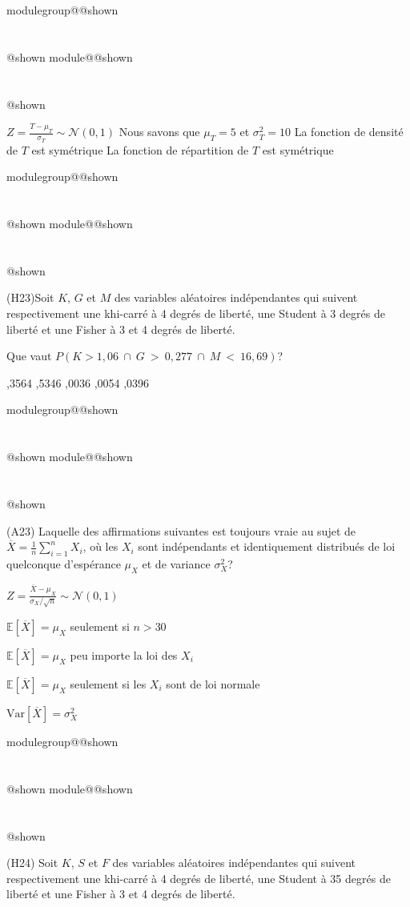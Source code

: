 \documentclass{Evaluation}
\makeatletter
\newcommand{\currentmodulekey}{}
\newcommand{\currentmoduletitle}{}
\newcommand{\currentgroupkey}{}
\newcommand{\currentgrouptitle}{}
\newcommand{\showmoduleifneeded}{%
  \ifx\currentgroupkey\empty\else
    \expandafter\ifx\csname modulegroup@\currentgroupkey @shown\endcsname\relax
      \section*{\currentgrouptitle}%
      \expandafter\gdef\csname modulegroup@\currentgroupkey @shown\endcsname{1}%
    \fi
  \fi
  \expandafter\ifx\csname module@\currentmodulekey @shown\endcsname\relax
    \section*{\currentmoduletitle}%
    \expandafter\gdef\csname module@\currentmodulekey @shown\endcsname{1}%
  \fi
}
\newenvironment{H23}{\showmoduleifneeded}{}
\newenvironment{A23}{\showmoduleifneeded}{}
\newenvironment{H24}{\showmoduleifneeded}{}
\makeatother
\begin{document}
\begin{questions}
\begin{H23}
\begin{checkboxes}
\choice $\displaystyle Z=\frac{T-\mu_T}{\sigma_T}\sim \mathcal{N}(0, 1)$
\choice Nous savons que $\mu_T=5$ et $\sigma^2_T=10$
\CorrectChoice La fonction de densité de $T$ est symétrique
\choice La fonction de répartition de $T$ est symétrique
\end{checkboxes}
\end{H23}

\begin{H23}
\question (H23)Soit $K$, $G$ et $M$ des variables aléatoires indépendantes qui suivent respectivement une khi-carré à 4 degrés de liberté, une Student à 3 degrés de liberté et une Fisher à 3 et 4 degrés de liberté. 

Que vaut $P(K>1,06~\cap~G~>~0,277~\cap~M~<~16,69)$?

\begin{oneparcheckboxes}
		,3564
		,5346
		,0036
		,0054
		,0396
\end{oneparcheckboxes}
\end{H23}

\begin{A23}
\question (A23) Laquelle des affirmations suivantes est toujours vraie au sujet de $\overline{X}=\displaystyle \frac{1}{n}\sum_{i=1}^n X_i$, où les $X_i$ sont indépendants et identiquement distribués de loi quelconque d'espérance $\mu_X$ et de variance $\sigma^2_X$? %

\begin{checkboxes}
\choice $\displaystyle Z=\frac{\overline{X}-\mu_X}{\sigma_X / \sqrt{n}}\sim \mathcal{N}(0, 1)$

\choice $\mathbb{E}\left[\overline{X}\right]=\mu_X$ seulement si $n>30$

\correctchoice $\mathbb{E}\left[\overline{X}\right]=\mu_X$ peu importe la loi des $X_i$

\choice $\displaystyle\mathbb{E}\left[\overline{X}\right]=\mu_X$  seulement si les $X_i$ sont de loi normale

\choice $\text{Var}\left[\overline{X}\right]=\sigma^2_X$
\end{checkboxes}
\end{A23}

\begin{H24}
\question (H24) Soit $K$, $S$ et $F$ des variables aléatoires indépendantes qui suivent respectivement une khi-carré à 4 degrés de liberté, une Student à 35 degrés de liberté et une Fisher à 3 et 4 degrés de liberté. 


\end{H24}
\end{questions}
\end{document}
